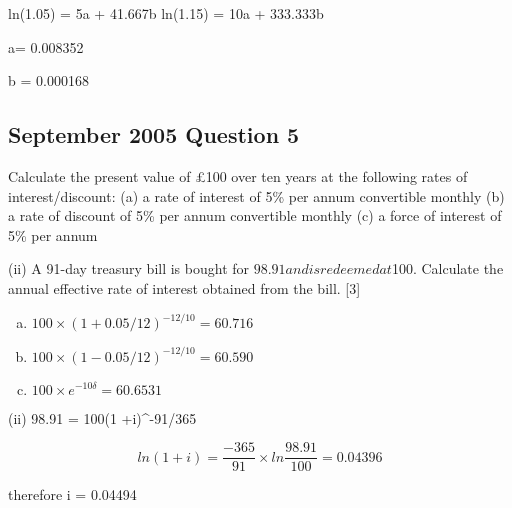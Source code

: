 \documentclass{article}
\begin{document}
    

    

ln(1.05) = 5a + 41.667b
ln(1.15) = 10a + 333.333b

a= 0.008352

b = 0.000168





\subsection*{September 2005 Question 5}

Calculate the present value of  £100 over ten years at the following rates of 
interest/discount:
(a)  a rate of interest of 5\% per annum convertible monthly
(b)  a rate of discount of 5\% per annum convertible monthly
(c)  a force of interest of 5\% per annum

(ii) A 91-day treasury bill is bought for $98.91 and is redeemed at $100.  
Calculate the annual effective rate of interest obtained from the bill.  [3]

\begin{enumerate}[(a)]
\item  $100 \times (1 +0.05/12)^{-12/10}= 60.716 $
\item  $100 \times (1 -0.05/12)^{-12/10}= 60.590 $

\item  $100 \times e^{-10\delta}= 60.6531$
\end{enumerate}


(ii) 98.91 = 100(1 +i)^{-91/365}

\[ ln(1 + i) = \frac{-365}{91} \times ln \frac{98.91}{100} = 0.04396\]

therefore 
            i = 0.04494
\end{document}
